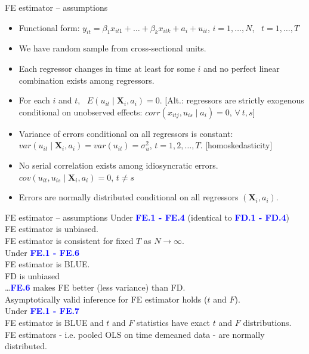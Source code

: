 \documentclass[usenames,dvipsnames]{beamer}
\begin{document}
\begin{frame}{FE estimator – assumptions}
\begin{itemize}
\item[\textbf{FE.1}] Functional form: $y_{it} = \beta_1 x_{it1} + \dots + \beta_k x_{itk} + a_i + u_{it}$, $i = 1, \dots, N$, \ $t = 1, \dots, T$
\item[\textbf{FE.2}] We have random sample from cross-sectional units.
\item[\textbf{FE.3}] Each regressor changes in time at least for some $i$ and no perfect linear combination exists among regressors.
\item[\textbf{FE.4}] For each $i$ and $t$, \ $E (u_{it} \mid \bm{X}_i, a_i) = 0$. [Alt.: regressors are strictly exogenous conditional on unobserved effects: $\textit{corr}(x_{itj}, u_{is} \mid a_i)=0$, \quad $\forall \ t, s$]
\item[\textbf{FE.5}] Variance of errors conditional on all regressors is constant: $\textit{var}(u_{it} \mid \bm{X}_i, a_i) = \textit{var}(u_{it}) = \sigma^2_u$, \quad $t= 1,2, \dots, T$. [homoskedasticity]
\item[\textbf{FE.6}] No serial correlation exists among idiosyncratic errors. $\textit{cov}(u_{it}, u_{is} \mid \bm{X}_i, a_i) = 0$, \quad $t \neq s$
\item[\textbf{FE.7}] Errors are normally distributed conditional on all regressors $(\bm{X}_i, a_i)$.
\end{itemize}
\end{frame}
\begin{frame}{FE estimator – assumptions}
Under \textcolor{Blue}{\textbf{FE.1 - FE.4}} (identical to  \textcolor{Blue}{\textbf{FD.1 - FD.4}})\\
FE estimator is unbiased. \\
FE estimator is consistent for fixed $T$ as $N \rightarrow \infty$.\\
\vspace{0.5cm}
Under \textcolor{Blue}{\textbf{FE.1 - FE.6}}\\
FE estimator is BLUE.\\
FD is unbiased\\ \dots  \textcolor{Blue}{\textbf{FE.6}} makes FE better (less variance) than FD.\\
Asymptotically valid inference for FE estimator holds ($t$ and $F$).\\
\vspace{0.5cm}
Under  \textcolor{Blue}{\textbf{FE.1 - FE.7}}\\
FE estimator is BLUE and $t$ and $F$ statistics have exact $t$ and $F$ distributions.\\
FE estimators - i.e. pooled OLS on time demeaned data - are normally distributed.
\end{frame}
\end{document}

